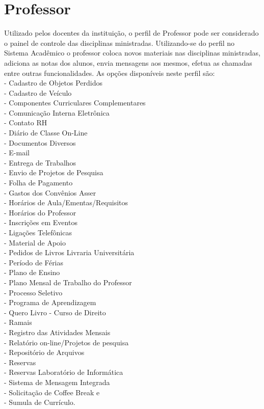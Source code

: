 \section{Professor}
Utilizado pelos docentes da instituição, o perfil de Professor pode ser considerado o painel de controle das disciplinas
ministradas. Utilizando-se do perfil no Sistema Acadêmico o professor coloca novos materiais nas disciplinas ministradas,
adiciona as notas dos alunos, envia mensagens aos mesmos, efetua as chamadas entre outras funcionalidades.
As opções disponíveis neste perfil são: \\
- Cadastro de Objetos Perdidos \\
- Cadastro de Veículo \\
- Componentes Curriculares Complementares \\
- Comunicação Interna Eletrônica \\
- Contato RH \\
- Diário de Classe On-Line \\
- Documentos Diversos \\
- E-mail \\
- Entrega de Trabalhos \\
- Envio de Projetos de Pesquisa \\
- Folha de Pagamento \\
- Gastos dos Convênios Asser \\
- Horários de Aula/Ementas/Requisitos \\
- Horários do Professor \\
- Inscrições em Eventos \\
- Ligações Telefônicas \\
- Material de Apoio \\
- Pedidos de Livros Livraria Universitária \\
- Período de Férias \\
- Plano de Ensino \\
- Plano Mensal de Trabalho do Professor \\
- Processo Seletivo \\
- Programa de Aprendizagem \\
- Quero Livro - Curso de Direito \\
- Ramais \\
- Registro das Atividades Mensais \\
- Relatório on-line/Projetos de pesquisa \\
- Repositório de Arquivos \\
- Reservas \\
- Reservas Laboratório de Informática \\
- Sistema de Mensagem Integrada \\
- Solicitação de Coffee Break e \\
- Sumula de Currículo. \\

